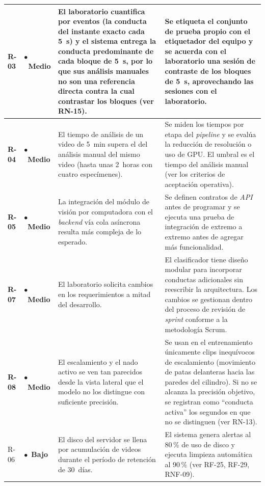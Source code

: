 \begin{longtable}{|>{\bfseries}p{0.9cm}|p{2.0cm}|p{4.5cm}|p{5.9cm}|}
R-03 & \cellcolor{orange!15}\textcolor{orange!80!black}{\Large$\bullet$}~\textbf{Medio}
     & El laboratorio cuantifica por eventos (la conducta del instante exacto cada
       5~s) y el sistema entrega la conducta predominante de cada bloque de 5~s, por
       lo que sus análisis manuales no son una referencia directa contra la cual
       contrastar los bloques (ver RN-15).
     & Se etiqueta el conjunto de prueba propio con el etiquetador del equipo y
       se acuerda con el laboratorio una sesión de contraste de los bloques de 5~s,
       aprovechando las sesiones con el laboratorio. \\
\hline
R-04 & \cellcolor{orange!15}\textcolor{orange!80!black}{\Large$\bullet$}~\textbf{Medio}
     & El tiempo de análisis de un video de 5~min supera el del análisis manual
       del mismo video (hasta unas 2~horas con cuatro especímenes).
     & Se miden los tiempos por etapa del \textit{pipeline} y se evalúa la reducción de resolución o
       uso de GPU. El umbral es el tiempo del análisis manual
       (ver los criterios de aceptación operativa). \\
\hline
R-05 & \cellcolor{orange!15}\textcolor{orange!80!black}{\Large$\bullet$}~\textbf{Medio}
     & La integración del módulo de visión por computadora con el \textit{backend}
       vía cola asíncrona resulta más compleja de lo esperado.
     & Se definen contratos de \textit{API} antes de programar
       y se ejecuta una prueba de integración de extremo a extremo antes de agregar
       más funcionalidad. \\
\hline
R-07 & \cellcolor{orange!15}\textcolor{orange!80!black}{\Large$\bullet$}~\textbf{Medio}
     & El laboratorio solicita cambios en los requerimientos a mitad del desarrollo.
     & El clasificador tiene diseño modular para incorporar conductas adicionales sin
       reescribir la arquitectura. Los cambios se gestionan dentro del proceso de
       revisión de \textit{sprint} conforme a la metodología Scrum. \\
\hline
R-08 & \cellcolor{orange!15}\textcolor{orange!80!black}{\Large$\bullet$}~\textbf{Medio}
     & El escalamiento y el nado activo se ven tan parecidos desde la vista lateral
       que el modelo no los distingue con suficiente precisión.
     & Se usan en el entrenamiento únicamente clips inequívocos de escalamiento
       (movimiento de patas delanteras hacia las paredes del cilindro). Si no se
       alcanza la precisión objetivo, se registran como ``conducta activa'' los
       segundos en que no se distinguen (ver RN-13). \\
\hline

R-06 & \cellcolor{green!12}\textcolor{green!55!black}{\Large$\bullet$}~\textbf{Bajo}
     & El disco del servidor se llena por acumulación de videos durante el período
       de retención de 30~días.
     & El sistema genera alertas al 80\,\% de uso de disco y ejecuta limpieza
       automática al 90\,\% (ver RF-25, RF-29, RNF-09). \\
\hline

\end{longtable}

